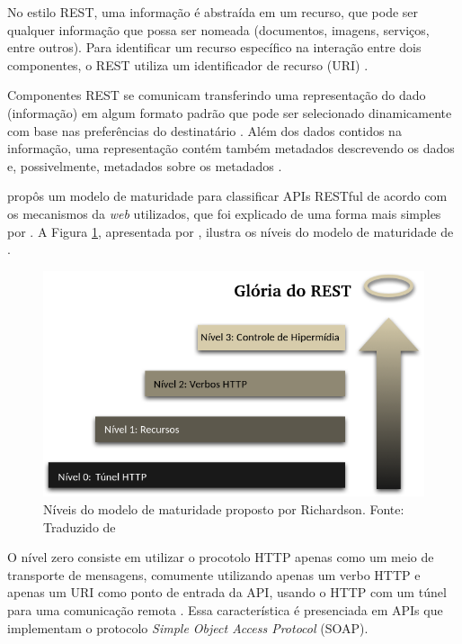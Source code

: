   No estilo REST, uma informação é abstraída em um recurso, que pode ser qualquer informação que possa ser nomeada
  (documentos, imagens, serviços, entre outros). Para identificar um recurso específico na interação entre dois
  componentes, o REST utiliza um identificador de recurso (URI) \cite{fielding2002}.
  
  Componentes REST se comunicam transferindo uma representação do dado (informação) em algum formato padrão que pode
  ser selecionado dinamicamente com base nas preferências do destinatário \cite{fielding2002}. Além dos dados contidos na 
  informação, uma representação contém também metadados descrevendo os dados e, possivelmente, metadados sobre os
  metadados \cite{fielding2002}.
  
       propôs um modelo de maturidade para classificar
      APIs RESTful de acordo com os mecanismos da \textit{web} utilizados,
      que foi explicado de uma forma mais simples por .
      A Figura \ref{fig:glory_of_rest}, apresentada por ,
      ilustra os níveis do modelo de maturidade de .
	
      \begin{figure}[h!]
	\centering
	\includegraphics[scale=0.5]{figuras/glory_of_rest.png}
	\caption{Níveis do modelo de maturidade proposto por Richardson. Fonte: Traduzido de \cite{fowler10}}
	\label{fig:glory_of_rest}
      \end{figure}
      
      O nível zero consiste em utilizar o procotolo HTTP apenas como um meio de transporte de mensagens,
      comumente utilizando apenas um verbo HTTP e apenas um URI como ponto de entrada da API, 
      usando o HTTP com um túnel para uma comunicação remota \cite{fowler10} \cite{richardson09}.
      Essa característica é presenciada em APIs que implementam o protocolo \textit{Simple Object Access Protocol} (SOAP).
      
